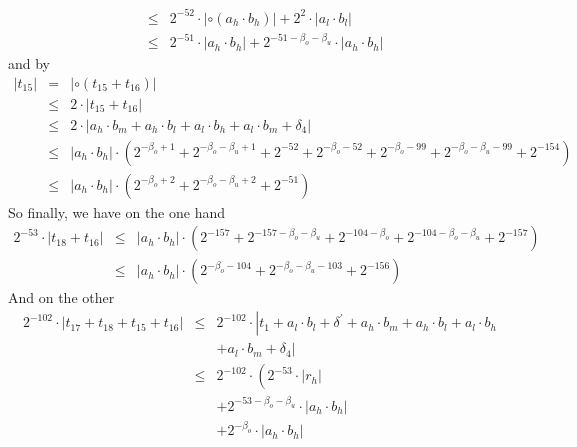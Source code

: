 \documentclass[a4paper,10pt,twoside]{article}
\newenvironment{proof}[1][Proof]{\begin{trivlist}
\item[\hskip \labelsep {\bfseries #1}]}{\end{trivlist}}
\newcommand{\hi}{\ensuremath{\mathit{h}}}
\newcommand{\mi}{\ensuremath{\mathit{m}}}
\newcommand{\lo}{\ensuremath{\mathit{l}}}
\begin{document}
\begin{proof}
\begin{eqnarray*}
& \leq & 2^{-52} \cdot \left \vert \circ \left( a_\hi \cdot b_\hi \right) \right \vert + 2^2 \cdot \left \vert a_\lo \cdot b_\lo \right \vert \\
& \leq & 2^{-51} \cdot \left \vert a_\hi \cdot b_\hi \right \vert + 2^{-51-\beta_o-\beta_u} \cdot \left \vert a_\hi \cdot b_\hi \right \vert
\end{eqnarray*}
and by
\begin{eqnarray*}
\left \vert t_{15} \right \vert & = & \left \vert \circ \left( t_{15} + t_{16} \right) \right \vert \\
& \leq & 2 \cdot \left \vert t_{15} + t_{16} \right \vert \\
& \leq & 2 \cdot \left \vert
a_\hi \cdot b_\mi + a_\hi \cdot b_\lo + a_\lo \cdot b_\hi + a_\lo \cdot b_\mi + \delta_4 \right \vert \\
& \leq & \left \vert a_\hi \cdot b_\hi \right \vert \cdot \left(
2^{-\beta_o+1} + 2^{-\beta_o-\beta_u+1} + 2^{-52} + 2^{-\beta_o-52} + 2^{-\beta_o-99} + 2^{-\beta_o-\beta_u-99} + 2^{-154}  \right) \\
& \leq & \left \vert a_\hi \cdot b_\hi \right \vert \cdot \left( 2^{-\beta_o+2} + 2^{-\beta_o-\beta_u+2} + 2^{-51}  \right)
\end{eqnarray*}
So finally, we have on the one hand
\begin{eqnarray*}
2^{-53} \cdot \left \vert t_{18} + t_{16} \right \vert & \leq &
\left \vert a_\hi \cdot b_\hi \right \vert \cdot \left( 2^{-157} + 2^{-157-\beta_o-\beta_u} + 2^{-104-\beta_o} +
2^{-104-\beta_o-\beta_u} + 2^{-157}  \right) \\
& \leq & \left \vert a_\hi \cdot b_\hi \right \vert \cdot \left( 2^{-\beta_o-104} + 2^{-\beta_o-\beta_u-103} + 2^{-156} \right)
\end{eqnarray*}
And on the other
\begin{eqnarray*}
2^{-102} \cdot \left \vert t_{17} + t_{18} + t_{15} + t_{16} \right \vert & \leq &
2^{-102} \cdot \left \vert t_1 + a_\lo \cdot b_\lo + \delta^\prime + a_\hi \cdot b_\mi + a_\hi \cdot b_\lo +
a_\lo \cdot b_\hi \right. \\ & & \left. + a_\lo \cdot b_\mi + \delta_4 \right \vert \\
& \leq & 2^{-102} \cdot \left( 2^{-53} \cdot \left \vert r_\hi \right \vert \right. \\
& & + 2^{-53-\beta_o-\beta_u} \cdot \left \vert a_\hi \cdot b_\hi \right \vert \\
& & + 2^{-\beta_o} \cdot \left \vert a_\hi \cdot b_\hi \right \vert \\

\end{eqnarray*}
\end{proof}
\end{document}
